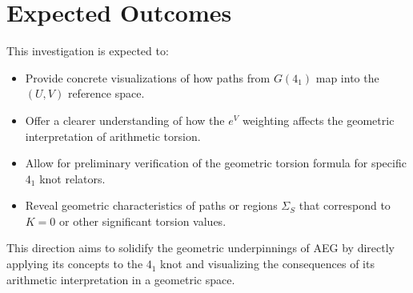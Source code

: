 \documentclass{article}
\begin{document}
\section{Expected Outcomes}
This investigation is expected to:
\begin{itemize}
    \item Provide concrete visualizations of how paths from $G(4_1)$ map into the $(U,V)$ reference space.
    \item Offer a clearer understanding of how the $e^V$ weighting affects the geometric interpretation of arithmetic torsion.
    \item Allow for preliminary verification of the geometric torsion formula for specific $4_1$ knot relators.
    \item Reveal geometric characteristics of paths or regions $\Sigma_S$ that correspond to $K=0$ or other significant torsion values.
\end{itemize}

This direction aims to solidify the geometric underpinnings of AEG by directly applying its concepts to the $4_1$ knot and visualizing the consequences of its arithmetic interpretation in a geometric space.
\end{document}
